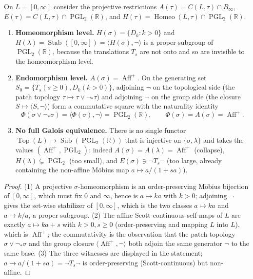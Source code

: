 \begin{theorem}
\label{thm:scott-lawson-functorial-square}
On $L=[0,\infty]$ consider the projective restrictions
$A(\tau)=C(L,\tau)\cap B_\infty$,
$E(\tau)=C(L,\tau)\cap\operatorname{PGL}_2(\mathbb R)$, and
$H(\tau)=\operatorname{Homeo}(L,\tau)\cap\operatorname{PGL}_2(\mathbb R)$.
\begin{enumerate}
  \item \textbf{Homeomorphism level.} $H(\sigma)=\{D_k:k>0\}$ and
  $H(\lambda)=\operatorname{Stab}([0,\infty])=\langle H(\sigma),\neg\rangle$ is a
  proper subgroup of $\operatorname{PGL}_2(\mathbb R)$, because the translations
  $T_s$ are not onto and so are invisible to the homeomorphism level.
  \item \textbf{Endomorphism level.} $A(\sigma)=\operatorname{Aff}^+$.  On the
  generating set $S_0=\{T_s(s\ge0),D_k(k>0)\}$, adjoining $\neg$ on the
  topological side (the patch topology $\tau\mapsto\tau\vee\neg_*\tau$) and
  adjoining $\neg$ on the group side (the closure $S\mapsto\langle S,\neg\rangle$)
  form a commutative square with the naturality identity
  \[
  \Phi(\sigma\vee\neg_*\sigma)=\langle\Phi(\sigma),\neg\rangle
  =\operatorname{PGL}_2(\mathbb R),
  \qquad
  \Phi(\sigma)=A(\sigma)=\operatorname{Aff}^+ .
  \]
  \item \textbf{No full Galois equivalence.} There is no single functor
  $\operatorname{Top}(L)\to\operatorname{Sub}(\operatorname{PGL}_2(\mathbb R))$
  that is injective on $\{\sigma,\lambda\}$ and takes the values
  $(\operatorname{Aff}^+,\operatorname{PGL}_2)$: indeed
  $A(\sigma)=A(\lambda)=\operatorname{Aff}^+$ (collapse),
  $H(\lambda)\subsetneq\operatorname{PGL}_2$ (too small), and
  $E(\sigma)\ni\neg T_s\neg$ (too large, already containing the non-affine
  M\"obius map $a\mapsto a/(1+sa)$).
\end{enumerate}
\end{theorem}

\begin{proof}
(1) A projective $\sigma$-homeomorphism is an order-preserving M\"obius bijection
of $[0,\infty]$, which must fix $0$ and $\infty$, hence is $a\mapsto ka$ with
$k>0$; adjoining $\neg$ gives the set-wise stabilizer of $[0,\infty]$, which is
the two classes $a\mapsto ka$ and $a\mapsto k/a$, a proper subgroup.  (2) The
affine Scott-continuous self-maps of $L$ are exactly $a\mapsto ka+s$ with
$k>0,s\ge0$ (order-preserving and mapping $L$ into $L$), which is
$\operatorname{Aff}^+$; the commutativity is the observation that the patch
topology $\sigma\vee\neg_*\sigma$ and the group closure $\langle\operatorname{Aff}^+,\neg\rangle$
both adjoin the same generator $\neg$ to the same base.  (3) The three
witnesses are displayed in the statement; $a\mapsto a/(1+sa)=\neg T_s\neg$ is
order-preserving (Scott-continuous) but non-affine.
\end{proof}

